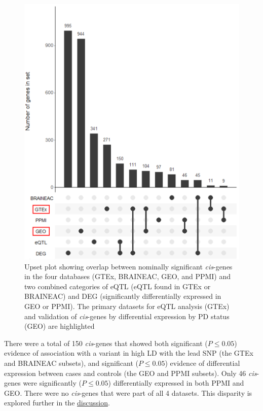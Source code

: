 \documentclass{article}
\begin{document}
\begin{figure}[!h]
    \centering
    \includegraphics[width=1\linewidth]{Thesis/thesis images/Upsetplot.png}
    \caption{Upset plot\cite{Conway2017UpSetR:Properties.} showing overlap between nominally significant \textit{cis}-genes in the four databases (GTEx, BRAINEAC, GEO, and PPMI) and two combined categories of eQTL (eQTL found in GTEx or BRAINEAC) and DEG (significantly differentially expressed in GEO or PPMI). The primary datasets for eQTL analysis (GTEx) and validation of \textit{cis}-genes by differential expression by PD status (GEO) are highlighted}
    \label{fig:enter-label}
\end{figure}
\newpage
There were a total of 150 \textit{cis}-genes that showed both significant ($P \leq 0.05$) evidence of association with a variant in high LD with the lead SNP (the GTEx and BRAINEAC subsets), and significant ($P \leq 0.05$) evidence of differential expression between cases and controls (the GEO and PPMI subsets). Only 46 \textit{cis}-genes were significantly ($P \leq 0.05$) differentially expressed in both PPMI and GEO. There were no \textit{cis}-genes that were part of all 4 datasets. This disparity is explored further in the \hyperref[subsec:studydesign]{discussion}.
\end{document}
